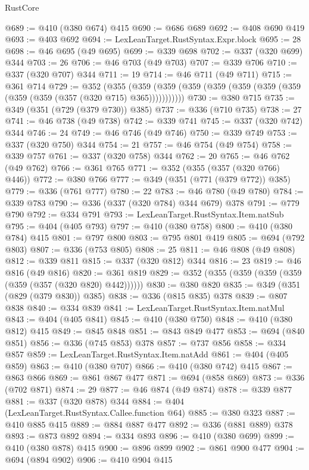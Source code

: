 \begin{lexlean}{RustCore}
\begin{coremodule}
@689 := @410 (@380 @674) @415
@690 := @686 @689
@692 := @408 @690 @419
@693 := @403 @692
@694 := LexLeanTarget.RustSyntax.Expr.block
@695 := 28
@698 := @46 @695 (@49 @695)
@699 := @339 @698
@702 := @337 (@320 @699) @344
@703 := 26
@706 := @46 @703 (@49 @703)
@707 := @339 @706
@710 := @337 (@320 @707) @344
@711 := 19
@714 := @46 @711 (@49 @711)
@715 := @361 @714
@729 := @352
    (@355 (@359 (@359 (@359 (@359 (@359 (@359 (@359 (@359 (@359 (@357 (@320 @715) @365)))))))))))
@730 := @380 @715
@735 := @349 (@351 (@729 (@379 @730)) @385)
@737 := @336 (@710 @735)
@738 := 27
@741 := @46 @738 (@49 @738)
@742 := @339 @741
@745 := @337 (@320 @742) @344
@746 := 24
@749 := @46 @746 (@49 @746)
@750 := @339 @749
@753 := @337 (@320 @750) @344
@754 := 21
@757 := @46 @754 (@49 @754)
@758 := @339 @757
@761 := @337 (@320 @758) @344
@762 := 20
@765 := @46 @762 (@49 @762)
@766 := @361 @765
@771 := @352 (@355 (@357 (@320 @766) @446))
@772 := @380 @766
@777 := @349 (@351 (@771 (@379 @772)) @385)
@779 := @336 (@761 @777)
@780 := 22
@783 := @46 @780 (@49 @780)
@784 := @339 @783
@790 := @336 (@337 (@320 @784) @344 @679) @378
@791 := @779 @790
@792 := @334 @791
@793 := LexLeanTarget.RustSyntax.Item.natSub
@795 := @404 (@405 @793)
@797 := @410 (@380 @758)
@800 := @410 (@380 @784) @415
@801 := @797 @800
@803 := @795 @801 @419
@805 := @694 (@792 @803)
@807 := @336 (@753 @805)
@808 := 25
@811 := @46 @808 (@49 @808)
@812 := @339 @811
@815 := @337 (@320 @812) @344
@816 := 23
@819 := @46 @816 (@49 @816)
@820 := @361 @819
@829 := @352 (@355 (@359 (@359 (@359 (@359 (@357 (@320 @820) @442))))))
@830 := @380 @820
@835 := @349 (@351 (@829 (@379 @830)) @385)
@838 := @336 (@815 @835) @378
@839 := @807 @838
@840 := @334 @839
@841 := LexLeanTarget.RustSyntax.Item.natMul
@843 := @404 (@405 @841)
@845 := @410 (@380 @750)
@848 := @410 (@380 @812) @415
@849 := @845 @848
@851 := @843 @849 @477
@853 := @694 (@840 @851)
@856 := @336 (@745 @853) @378
@857 := @737 @856
@858 := @334 @857
@859 := LexLeanTarget.RustSyntax.Item.natAdd
@861 := @404 (@405 @859)
@863 := @410 (@380 @707)
@866 := @410 (@380 @742) @415
@867 := @863 @866
@869 := @861 @867 @477
@871 := @694 (@858 @869)
@873 := @336 (@702 @871)
@874 := 29
@877 := @46 @874 (@49 @874)
@878 := @339 @877
@881 := @337 (@320 @878) @344
@884 := @404 (LexLeanTarget.RustSyntax.Callee.function @64)
@885 := @380 @323
@887 := @410 @885 @415
@889 := @884 @887 @477
@892 := @336 (@881 @889) @378
@893 := @873 @892
@894 := @334 @893
@896 := @410 (@380 @699)
@899 := @410 (@380 @878) @415
@900 := @896 @899
@902 := @861 @900 @477
@904 := @694 (@894 @902)
@906 := @410 @904 @415

\end{coremodule}
\end{lexlean}
